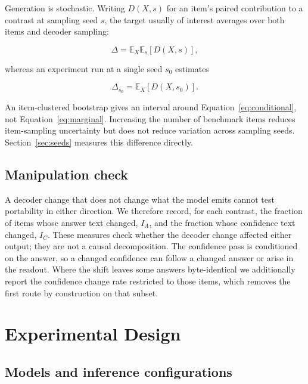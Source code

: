 \documentclass[information,article,submit,moreauthors]{Definitions/mdpi}
\begin{document}
Generation is stochastic. Writing $D(X,s)$ for an item's paired contribution to
a contrast at sampling seed $s$, the target usually of interest averages over
both items and decoder sampling:

\begin{equation}
\Delta = \mathbb{E}_X \mathbb{E}_s\!\left[D(X,s)\right],
\label{eq:marginal}
\end{equation}

\noindent
whereas an experiment run at a single seed $s_0$ estimates

\begin{equation}
\Delta_{s_0} = \mathbb{E}_X\!\left[D(X,s_0)\right].
\label{eq:conditional}
\end{equation}

\noindent
An item-clustered bootstrap gives an interval around
Equation~\eqref{eq:conditional}, not Equation~\eqref{eq:marginal}. Increasing
the number of benchmark items reduces item-sampling uncertainty but does not
reduce variation across sampling seeds. Section~\ref{sec:seeds} measures this
difference directly.

\subsection{Manipulation check}

A decoder change that does not change what the model emits cannot test
portability in either direction. We therefore record, for each contrast, the
fraction of items whose answer text changed, $I_A$, and the fraction whose
confidence text changed, $I_C$. These measures check whether the decoder change
affected either output; they are not a causal decomposition. The confidence
pass is conditioned on
the answer, so a changed confidence can follow a changed answer or arise in the
readout. Where the shift leaves some answers byte-identical we additionally
report the confidence change rate restricted to those items, which removes the
first route by construction on that subset.

\section{Experimental Design}
\label{sec:design}

\subsection{Models and inference configurations}
\end{document}
